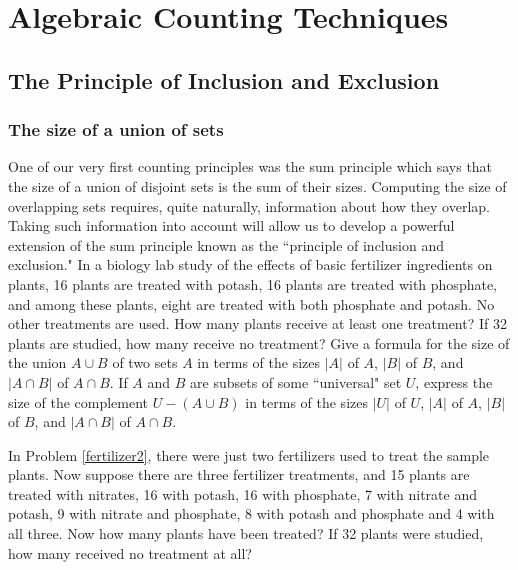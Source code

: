 \chapter{Algebraic Counting Techniques}
\section{The Principle of Inclusion and Exclusion}
\subsection{The size of a union of sets}  One of our  very first counting
principles was the {sum principle} which says that
the size of a union of disjoint sets is the sum of their sizes. 
Computing the size of overlapping sets requires, quite naturally,
information about how they overlap.  Taking such information into account
will allow us to develop a powerful extension of the sum principle known
as the ``principle of inclusion and exclusion."
  \bp
\itemm In a biology lab study of the effects of basic fertilizer
ingredients on plants, 16 plants are treated with potash, 16 plants are
treated with phosphate, and among these plants, eight are treated with
both phosphate and potash. No other treatments are used.  How many plants
receive at least one treatment?  If 32 plants are studied, how many
receive no treatment?\label{fertilizer2}
\items  Give a formula for the size of the union $A\cup B$ of two
sets
$A$ in terms of the sizes $|A|$ of $A$, $|B|$ of $B$, and $|A\cap B|$ of
$A\cap B$. If $A$ and $B$ are subsets of some ``universal" set $U$,
express the size of the complement $U-(A\cup B)$ in terms of the sizes
$|U|$ of $U$, $|A|$ of $A$, $|B|$ of $B$, and $|A\cap B|$ of
$A\cap B$.

\itemm In Problem \ref{fertilizer2}, there were just two fertilizers used
to treat the sample plants.  Now suppose there are three fertilizer
treatments, and 15 plants are treated with nitrates, 16 with potash, 16
with phosphate, 7 with nitrate and potash, 9 with nitrate and phosphate,
8 with  potash and phosphate and 4 with all three.  Now how many plants
have been treated?  If 32 plants were studied, how many received no
treatment at all?

